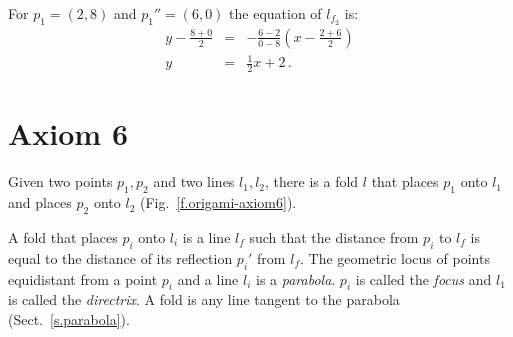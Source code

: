 \begin{example}
For $p_1=(2,8)$ and $p_1''=(6,0)$ the equation of  $l_{f_2}$ is:
%
\begin{eqnarray*}
y-\frac{8+0}{2}&=&-\frac{6-2}{0-8}\left(x-\frac{2+6}{2}\right)\\
y&=&\frac{1}{2}x+2\,.
\end{eqnarray*}
\end{example}




\section{Axiom 6}\label{s.ax6}
\begin{axiom}
Given two points $p_1,p_2$ and two lines $l_1,l_2$, there is a fold $l$ that places $p_1$ onto $l_1$ and places $p_2$ onto $l_2$ (Fig.~\ref{f.origami-axiom6}).
\end{axiom}

A fold that places $p_i$ onto $l_i$ is a line $l_f$ such that the distance from $p_i$ to $l_f$ is equal to the distance of its reflection $p_i'$ from $l_f$. The geometric locus of points equidistant from a point $p_i$ and a line $l_i$ is a \emph{parabola}. $p_i$ is called the \emph{focus} and $l_1$ is called the \emph{directrix}. A fold is any line tangent to the parabola (Sect.~\ref{s.parabola}).

